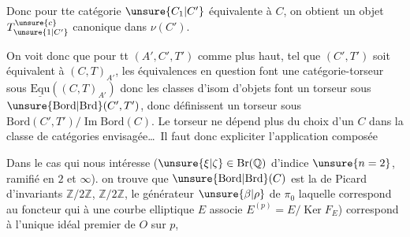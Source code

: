 
Donc pour tte catégorie $\unsure{C_1|C'}$ équivalente à $C$,
on obtient un objet $T_{\unsure{1|C'}}^{\unsure{c}}$ canonique dans $\nu(C')$.

On voit donc que pour tt $(A',C',T')$ comme
plus haut,  tel que $(C',T')$ soit
équivalent à $(C,T)_{A'}$, les équivalences
en question font une catégorie-torseur sous
$\underline{\mathrm{Equ}}((C,T)_{A'})$  donc 
les classes d'isom d'objets font
un torseur sous 
$\unsure{\mathrm{Bord}|\mathrm{Brd}}(C',T')$, donc définissent un torseur sous
$\mathrm{Bord}(C',T')/\operatorname{Im}\mathrm{Bord}(C)$. Le torseur ne dépend
plus du choix d'un $C$ dans la classe
de catégories envisagée\ldots\ Il faut donc expliciter
l'application composée



Dans le cas qui nous intéresse ($\unsure{\xi|\zeta}\in\mathrm{Br}(\mathbb Q)$
d'indice $\unsure{n=2}$, ramifié  en $2$ et $\infty$). 
on trouve que $\unsure{\mathrm{Bord}|\mathrm{Brd}}(C)$ est la  de Picard
 d'invariants $\mathbb Z/2\mathbb Z$, $\mathbb Z/2\mathbb Z$, le générateur
$\unsure{\beta|\rho}$ de $\pi_0$ laquelle correspond au  foncteur
qui à une courbe elliptique $E$ associe $E^{(p)}=E/\operatorname{Ker} F_E$)
correspond à l'unique idéal premier  de $O$ sur $p$,

